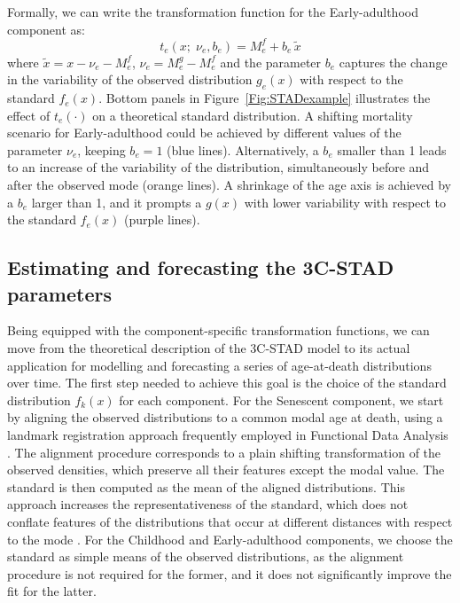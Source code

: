 \documentclass[11pt, a4paper]{article}
\begin{document}
Formally, we can write the transformation function for the Early-adulthood component as:
%
\begin{equation}\label{Eq:STADacc}
t_{e}(x;\;\nu_{e}, b_{e}) =  M_{e}^{f} + b_{e} \, \tilde{x} 
\end{equation} 
%
where $\tilde{x} = x - \nu_{e} - M_{e}^{f}$, $\nu_{e} = M_{e}^{g} - M_{e}^{f}$ and the parameter $b_{e}$ captures the change in the variability of the observed distribution $g_{e}(x)$ with respect to the standard $f_{e}(x)$. Bottom panels in Figure~\ref{Fig:STADexample} illustrates the effect of $t_{e}(\cdot)$ on a theoretical standard distribution. A shifting mortality scenario for Early-adulthood could be achieved by different values of the parameter $\nu_{e}$, keeping $b_{e}=1$ (blue lines). Alternatively, a $b_{e}$ smaller than 1 leads to an increase of the variability of the distribution, simultaneously before and after the observed mode (orange lines). A shrinkage of the age axis is achieved by a $b_{e}$ larger than 1, and it prompts a $g(x)$ with lower variability with respect to the standard $f_{e}(x)$ (purple lines). 



\subsection{Estimating and forecasting the 3C-STAD parameters}\label{Subsec:STADforecast}

Being equipped with the component-specific transformation functions, we can move from the theoretical description of the 3C-STAD model to its actual application for modelling and forecasting a series of age-at-death distributions over time. The first step needed to achieve this goal is the choice of the standard distribution $f_{k}(x)$ for each component. For the Senescent component, {\color{red}we start by aligning the observed distributions to a common modal age at death, using a landmark registration approach frequently employed in Functional Data Analysis \citep{ramsay2005FDA}. The alignment procedure corresponds to a plain shifting transformation of the observed densities, which preserve all their features except the modal value. The standard is then computed as the mean of the aligned distributions. This approach increases the representativeness of the standard, which does} not conflate features of the distributions that occur at different distances with respect to the mode \cite[{\color{red}for additional details and an explicative illustration,} see][{\color{red}pp.~122--124}]{basellini2019stad}. For the Childhood and Early-adulthood components, we choose the standard as simple means of the observed distributions, as the alignment procedure is not required for the former, and it does not significantly improve the fit for the latter. 
\end{document}
